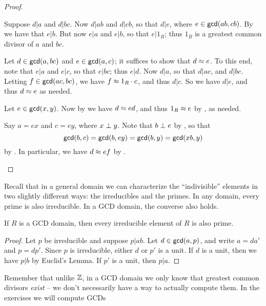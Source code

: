 \begin{proof}
\begin{inlineproplist}
\item Suppose \(d|a\) and \(d|bc\). Now \(d|ab\) and \(d|cb\), so that \(d|e\), where \(e \in \mathsf{gcd}(ab, cb)\). By  we have that \(e|b\). But now \(e|a\) and \(e|b\), so that \(e|1_R\); thus \(1_R\) is a greatest common divisor of \(a\) and \(bc\).
\item Let \(d \in \mathsf{gcd}(a, bc)\) and \(e \in \mathsf{gcd}(a, c)\); it suffices to show that \(d \approx e\). To this end, note that \(e|a\) and \(e|c\), so that \(e|bc\); thus \(e|d\). Now \(d|a\), so that \(d|ac\), and \(d|bc\). Letting \(f \in \mathsf{gcd}(ac, bc)\), we have \(f \approx 1_R \cdot c\), and thus \(d|c\). So we have \(d|e\), and thus \(d \approx e\) as needed.
\item Let \(e \in \mathsf{gcd}(x, y)\). Now by  we have \(d \approx ed\), and thus \(1_R \approx e\) by , as needed.
\item Say \(a = ex\) and \(c = ey\), where \(x \perp y\). Note that \(b \perp e\) by , so that \[ \mathsf{gcd}(b, c) = \mathsf{gcd}(b, ey) = \mathsf{gcd}(b, y) = \mathsf{gcd}(xb, y) \] by . In particular, we have \(d \approx ef\) by .
\end{inlineproplist}
\end{proof}


Recall that in a general domain we can characterize the ``indivisible'' elements in two slightly different ways: the irreducibles and the primes. In any domain, every prime is also irreducible. In a GCD domain, the converse also holds.

\begin{prop} \label{prop:gcd-irreducible-implies-prime}
If \(R\) is a GCD domain, then every irreducible element of \(R\) is also prime.
\end{prop}

\begin{proof}
Let \(p\) be irreducible and suppose \(p|ab\). Let \(d \in \mathsf{gcd}(a, p)\), and write \(a = da'\) and \(p = dp'\). Since \(p\) is irreducible, either \(d\) or \(p'\) is a unit. If \(d\) is a unit, then we have \(p|b\) by Euclid's Lemma. If \(p'\) is a unit, then \(p|a\).
\end{proof}

Remember that unlike \(\mathbb{Z}\), in a GCD domain we only know that greatest common divisors \emph{exist} -- we don't necessarily have a way to actually compute them. In the exercises we will compute GCDs 



